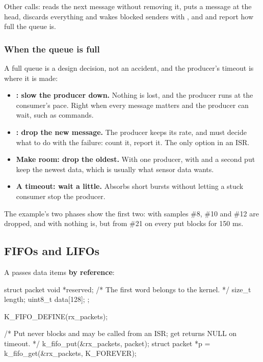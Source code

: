 Other calls:  reads the next message without removing it,
 puts a message at the head,  discards everything and
wakes blocked senders with , and  and
 report how full the queue is.

\subsubsection{When the queue is full}
A full queue is a design decision, not an accident, and the producer’s timeout is where it is made:

\begin{itemize}
  \item \textbf{: slow the producer down.} Nothing is lost, and the producer runs at the
    consumer’s pace. Right when every message matters and the producer can wait, such as commands.
  \item \textbf{: drop the new message.} The producer keeps its rate, and must decide what
    to do with the failure: count it, report it. The only option in an ISR.
  \item \textbf{Make room: drop the oldest.} With one producer,  with 
    and a second put keep the newest data, which is usually what sensor data wants.
  \item \textbf{A timeout: wait a little.} Absorbs short bursts without letting a stuck consumer stop the
    producer.
\end{itemize}

The example’s two phases show the first two: with  samples \#8, \#10 and \#12 are
dropped, and with  nothing is, but from \#21 on every put blocks for 150 ms.

\subsection{FIFOs and LIFOs}
A  passes data items \textbf{by reference}:

\begin{ccode}
struct packet {
	void *reserved;      /* The first word belongs to the kernel. */
	size_t length;
	uint8_t data[128];
};

K_FIFO_DEFINE(rx_packets);

/* Put never blocks and may be called from an ISR; get returns NULL on timeout. */
k_fifo_put(&rx_packets, packet);
struct packet *p = k_fifo_get(&rx_packets, K_FOREVER);
\end{ccode}


